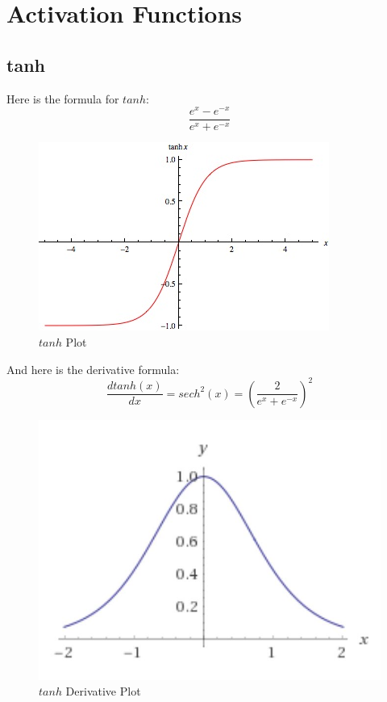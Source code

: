 \section{Activation Functions}

\subsection{tanh}

Here is the formula for $tanh$: 
\begin{equation}
    \frac{e^x - e^{-x}}{e^x + e^{-x}}
\end{equation}

\begin{figure}[!htb]
    \centering
    \includegraphics{images/TanhReal.jpg}
    \caption{$tanh$ Plot}
\end{figure}

And here is the derivative formula: 
\begin{equation}
    \frac{d tanh(x)}{dx} = sech^2(x) = \left( \frac{2}{e^x + e^{-x}} \right)^2
\end{equation}

\begin{figure}[!htb]
    \centering
    \includegraphics{images/tanhderivative.JPG}
    \caption{$tanh$ Derivative Plot}
\end{figure}

